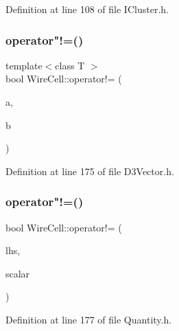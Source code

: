 Definition at line 108 of file I\+Cluster.\+h.

\mbox{\label{namespace_wire_cell_a476efb88c97bef8a48b8fe026ea65ee7}} 
\subsubsection{\texorpdfstring{operator"!=()}{operator!=()}\hspace{0.1cm}{\footnotesize\ttfamily [1/3]}}
{\footnotesize\ttfamily template$<$class T $>$ \\
bool Wire\+Cell\+::operator!= (\begin{DoxyParamCaption}\item[{const \hyperlink{class_wire_cell_1_1_d3_vector}{D3\+Vector}$<$ T $>$ \&}]{a,  }\item[{const \hyperlink{class_wire_cell_1_1_d3_vector}{D3\+Vector}$<$ T $>$ \&}]{b }\end{DoxyParamCaption})}



Definition at line 175 of file D3\+Vector.\+h.

\mbox{\label{namespace_wire_cell_a01b41dc8ff8e255995b2f7614561f60c}} 
\subsubsection{\texorpdfstring{operator"!=()}{operator!=()}\hspace{0.1cm}{\footnotesize\ttfamily [2/3]}}
{\footnotesize\ttfamily bool Wire\+Cell\+::operator!= (\begin{DoxyParamCaption}\item[{const \hyperlink{class_wire_cell_1_1_quantity}{Wire\+Cell\+::\+Quantity} \&}]{lhs,  }\item[{const double \&}]{scalar }\end{DoxyParamCaption})\hspace{0.3cm}{\ttfamily [inline]}}



Definition at line 177 of file Quantity.\+h.

